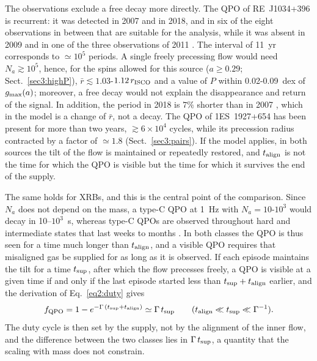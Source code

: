 The observations exclude a free decay more directly.
The QPO of RE~J1034+396 is recurrent: it was detected in 2007 and in 2018, and in six of the eight observations in between that are suitable for the analysis, while it was absent in 2009 and in one of the three observations of 2011 \citep{Alston2014,Jin2020}.
The interval of 11~yr corresponds to $\simeq10^5$ periods.
A single freely precessing flow would need $N_a\gtrsim10^5$, hence, for the spins allowed for this source ($a\geq0.29$; Sect.~\ref{sec3:highP}), $\bar r\lesssim1.03$-$1.12\,r_\textup{ISCO}$ and a value of $P$ within 0.02-0.09~dex of $g_\textup{max}(a)$; moreover, a free decay would not explain the disappearance and return of the signal.
In addition, the period in 2018 is $7\%$ shorter than in 2007 \citep{Jin2020}, which in the model is a change of $\bar r$, not a decay.
The QPO of 1ES~1927+654 has been present for more than two years, $\gtrsim6\times10^4$ cycles, while its precession radius contracted by a factor of $\simeq1.8$ (Sect.~\ref{sec3:pairs}).
If the model applies, in both sources the tilt of the flow is maintained or repeatedly restored, and $t_\textup{align}$ is not the time for which the QPO is visible but the time for which it survives the end of the supply.

The same holds for XRBs, and this is the central point of the comparison.
Since $N_a$ does not depend on the mass, a type-C QPO at 1~Hz with $N_a=10$-$10^3$ would decay in 10--$10^3$~s, whereas type-C QPOs are observed throughout hard and intermediate states that last weeks to months \citep{ingram}.
In both classes the QPO is thus seen for a time much longer than $t_\textup{align}$, and a visible QPO requires that misaligned gas be supplied for as long as it is observed.
If each episode maintains the tilt for a time $t_\textup{sup}$, after which the flow precesses freely, a QPO is visible at a given time if and only if the last episode started less than $t_\textup{sup}+t_\textup{align}$ earlier, and the derivation of Eq.~\eqref{eq2:duty} gives
\begin{equation}
    \label{eq5:duty}
    f_\textup{QPO}=1-e^{-\Gamma\,(t_\textup{sup}+t_\textup{align})}\simeq\Gamma\,t_\textup{sup}\qquad(t_\textup{align}\ll t_\textup{sup}\ll\Gamma^{-1}).
\end{equation}
The duty cycle is then set by the supply, not by the alignment of the inner flow, and the difference between the two classes lies in $\Gamma\,t_\textup{sup}$, a quantity that the scaling with mass does not constrain.

